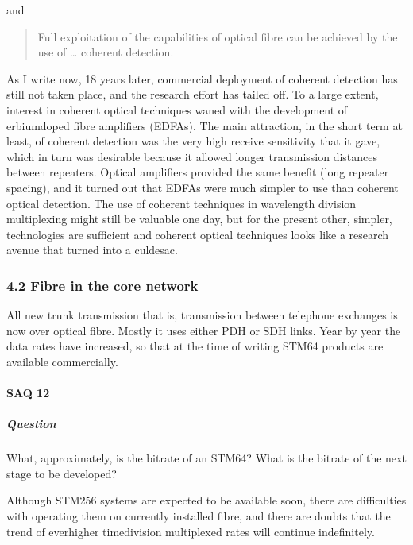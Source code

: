 \documentclass[letterpaper,10pt,english]{sphinxmanual}
\begin{document}
and


\begin{quote}

Full exploitation of the capabilities of optical fibre can be achieved by the use of … coherent detection.
\end{quote}

As I write now, 18 years later, commercial deployment of coherent detection has still not taken place, and the research effort has tailed off. To a large extent, interest in coherent optical techniques waned with the development of erbium\sphinxhyphen{}doped fibre amplifiers (EDFAs). The main attraction, in the short term at least, of coherent detection was the very high receive sensitivity that it gave, which in turn was desirable because it allowed longer transmission distances between repeaters. Optical
amplifiers provided the same benefit (long repeater spacing), and it turned out that EDFAs were much simpler to use than coherent optical detection. The use of coherent techniques in wavelength division multiplexing might still be valuable one day, but for the present other, simpler, technologies are sufficient and coherent optical techniques looks like a research avenue that turned into a cul\sphinxhyphen{}de\sphinxhyphen{}sac.


\subsubsection{4.2 Fibre in the core network}
\label{\detokenize{content/session_00/Part_00_04:4.2-Fibre-in-the-core-network}}
All new trunk transmission \textendash{} that is, transmission between telephone exchanges \textendash{} is now over optical fibre. Mostly it uses either PDH or SDH links. Year by year the data rates have increased, so that at the time of writing STM\sphinxhyphen{}64 products are available commercially.


\paragraph{SAQ 12}
\label{\detokenize{content/session_00/Part_00_04:SAQ-12}}

\subparagraph{Question}
\label{\detokenize{content/session_00/Part_00_04:Question}}
What, approximately, is the bit\sphinxhyphen{}rate of an STM\sphinxhyphen{}64? What is the bit\sphinxhyphen{}rate of the next stage to be developed?

Although STM\sphinxhyphen{}256 systems are expected to be available soon, there are difficulties with operating them on currently installed fibre, and there are doubts that the trend of ever\sphinxhyphen{}higher time\sphinxhyphen{}division multiplexed rates will continue indefinitely.
\end{document}
